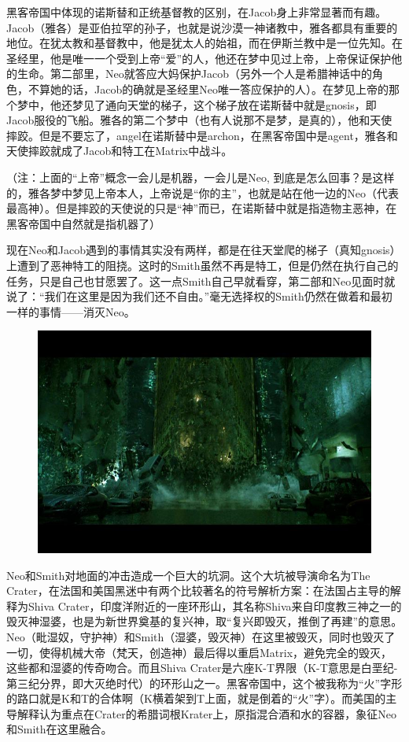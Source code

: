 \documentclass[UTF8]{ctexart}
\begin{document}
黑客帝国中体现的诺斯替和正统基督教的区别，在Jacob身上非常显著而有趣。Jacob（雅各）是亚伯拉罕的孙子，也就是说沙漠一神诸教中，雅各都具有重要的地位。在犹太教和基督教中，他是犹太人的始祖，而在伊斯兰教中是一位先知。在圣经里，他是唯一一个受到上帝“爱”的人，他还在梦中见过上帝，上帝保证保护他的生命。第二部里，Neo就答应大妈保护Jacob（另外一个人是希腊神话中的角色，不算她的话，Jacob的确就是圣经里Neo唯一答应保护的人）。在梦见上帝的那个梦中，他还梦见了通向天堂的梯子，这个梯子放在诺斯替中就是gnosis，即Jacob服役的飞船。雅各的第二个梦中（也有人说那不是梦，是真的），他和天使摔跤。但是不要忘了，angel在诺斯替中是archon，在黑客帝国中是agent，雅各和天使摔跤就成了Jacob和特工在Matrix中战斗。

（注：上面的“上帝”概念一会儿是机器，一会儿是Neo, 到底是怎么回事？是这样的，雅各梦中梦见上帝本人，上帝说是“你的主”，也就是站在他一边的Neo（代表最高神）。但是摔跤的天使说的只是“神”而已，在诺斯替中就是指造物主恶神，在黑客帝国中自然就是指机器了）

现在Neo和Jacob遇到的事情其实没有两样，都是在往天堂爬的梯子（真知gnosis）上遭到了恶神特工的阻挠。这时的Smith虽然不再是特工，但是仍然在执行自己的任务，只是自己也甘愿罢了。这一点Smith自己早就看穿，第二部和Neo见面时就说了：“我们在这里是因为我们还不自由。”毫无选择权的Smith仍然在做着和最初一样的事情——消灭Neo。

\begin{figure}[htb]
\centering
\includegraphics[width=0.5\linewidth]{fig/2c634b90158ee58ea977a490.jpg}
\end{figure}

Neo和Smith对地面的冲击造成一个巨大的坑洞。这个大坑被导演命名为The Crater，在法国和美国黑迷中有两个比较著名的符号解析方案：在法国占主导的解释为Shiva Crater，印度洋附近的一座环形山，其名称Shiva来自印度教三神之一的毁灭神湿婆，也是为新世界奠基的复兴神，取“复兴即毁灭，推倒了再建”的意思。Neo（毗湿奴，守护神）和Smith（湿婆，毁灭神）在这里被毁灭，同时也毁灭了一切，使得机械大帝（梵天，创造神）最后得以重启Matrix，避免完全的毁灭，这些都和湿婆的传奇吻合。而且Shiva Crater是六座K-T界限（K-T意思是白垩纪-第三纪分界，即大灭绝时代）的环形山之一。黑客帝国中，这个被我称为“火”字形的路口就是K和T的合体啊（K横着架到T上面，就是倒着的“火”字）。而美国的主导解释认为重点在Crater的希腊词根Krater上，原指混合酒和水的容器，象征Neo和Smith在这里融合。
\end{document}
